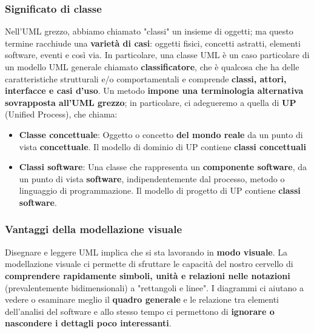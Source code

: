 \documentclass[12pt]{article}
\begin{document}
\subsubsection{Significato di classe}
Nell'UML grezzo, abbiamo chiamato "classi" un insieme di oggetti; ma questo termine racchiude una \textbf{varietà di casi}: oggetti fisici, concetti astratti, elementi software, eventi e così via.
In particolare, una classe UML è un caso particolare di un modello UML generale chiamato \textbf{classificatore}, che è qualcosa che ha delle caratteristiche strutturali e/o comportamentali e comprende \textbf{classi, attori, interfacce e casi d'uso}.
Un metodo \textbf{impone una terminologia alternativa sovrapposta all'UML grezzo}; in particolare, ci adegueremo a quella di \textbf{UP} (Unified Process), che chiama:
\begin{itemize}
    \item \textbf{Classe concettuale}: Oggetto o concetto \textbf{del mondo reale} da un punto di vista \textbf{concettuale}. Il modello di dominio di UP contiene \textbf{classi concettuali}
    \item \textbf{Classi software}: Una classe che rappresenta un \textbf{componente software}, da un punto di vista \textbf{software}, indipendentemente dal processo, metodo o linguaggio di programmazione. Il modello di progetto di UP contiene \textbf{classi software}.
\end{itemize}
\subsubsection{Vantaggi della modellazione visuale}
Disegnare e leggere UML implica che si sta lavorando in \textbf{modo visuale}. La modellazione visuale ci permette di sfruttare le capacità del nostro cervello di \textbf{comprendere rapidamente simboli, unità e relazioni nelle notazioni} (prevalentemente bidimensionali) a "rettangoli e linee".
I diagrammi ci aiutano a vedere o esaminare meglio il \textbf{quadro generale} e le relazione tra elementi dell'analisi del software e allo stesso tempo ci permettono di \textbf{ignorare o nascondere i dettagli poco interessanti}.
\end{document}
